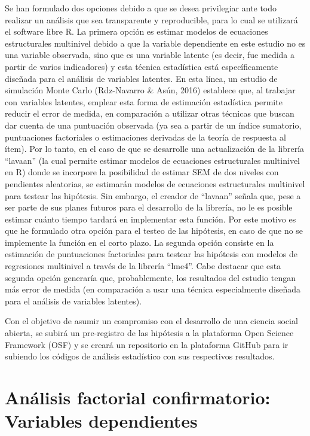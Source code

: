 \documentclass[12pt,twoside]{templates/facsothesis}
\begin{document}
Se han formulado dos opciones debido a que se desea privilegiar ante todo realizar un análisis que sea transparente y reproducible, para lo cual se utilizará el software libre R. La primera opción es estimar modelos de ecuaciones estructurales multinivel debido a que la variable dependiente en este estudio no es una variable observada, sino que es una variable latente (es decir, fue medida a partir de varios indicadores) y esta técnica estadística está específicamente diseñada para el análisis de variables latentes. En esta línea, un estudio de simulación Monte Carlo (Rdz-Navarro \& Asún, 2016) establece que, al trabajar con variables latentes, emplear esta forma de estimación estadística permite reducir el error de medida, en comparación a utilizar otras técnicas que buscan dar cuenta de una puntuación observada (ya sea a partir de un índice sumatorio, puntuaciones factoriales o estimaciones derivadas de la teoría de respuesta al ítem). Por lo tanto, en el caso de que se desarrolle una actualización de la librería ``lavaan'' (la cual permite estimar modelos de ecuaciones estructurales multinivel en R) donde se incorpore la posibilidad de estimar SEM de dos niveles con pendientes aleatorias, se estimarán modelos de ecuaciones estructurales multinivel para testear las hipótesis. Sin embargo, el creador de ``lavaan'' señala que, pese a ser parte de sus planes futuros para el desarrollo de la librería, no le es posible estimar cuánto tiempo tardará en implementar esta función. Por este motivo es que he formulado otra opción para el testeo de las hipótesis, en caso de que no se implemente la función en el corto plazo. La segunda opción consiste en la estimación de puntuaciones factoriales para testear las hipótesis con modelos de regresiones multinivel a través de la librería ``lme4''. Cabe destacar que esta segunda opción generaría que, probablemente, los resultados del estudio tengan más error de medida (en comparación a usar una técnica especialmente diseñada para el análisis de variables latentes).

Con el objetivo de asumir un compromiso con el desarrollo de una ciencia social abierta, se subirá un pre-registro de las hipótesis a la plataforma Open Science Framework (OSF) y se creará un repositorio en la plataforma GitHub para ir subiendo los códigos de análisis estadístico con sus respectivos resultados.

\hypertarget{anuxe1lisis-factorial-confirmatorio-variables-dependientes}{%
\chapter{Análisis factorial confirmatorio: Variables dependientes}\label{anuxe1lisis-factorial-confirmatorio-variables-dependientes}}
\end{document}
